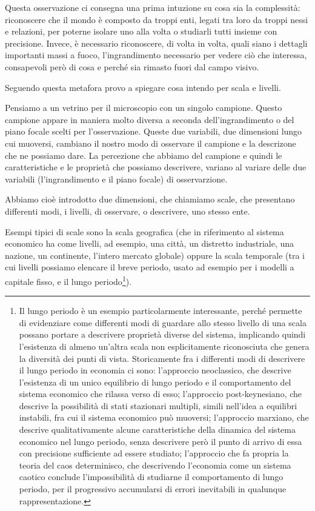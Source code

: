 \documentclass[a4paper, headings=standardclasses]{scrartcl}
\begin{document}
Questa osservazione ci consegna una prima intuzione su cosa sia la complessità: riconoscere che il mondo è composto da troppi enti, legati tra loro da troppi nessi e relazioni, per poterne isolare uno alla volta o studiarli tutti insieme con precisione. Invece, è necessario riconoscere, di volta in volta, quali siano i dettagli importanti massi a fuoco, l'ingrandimento necessario per vedere ciò che interessa, consapevoli però di cosa e perché sia rimasto fuori dal campo visivo.

Seguendo questa metafora provo a spiegare cosa intendo per scala e livelli.

Pensiamo a un vetrino per il microscopio con un singolo campione. Questo campione appare
in maniera molto diversa a seconda dell'ingrandimento o del piano focale scelti per l'osservazione.
Queste due variabili, due dimensioni lungo cui muoversi, cambiano il nostro modo di osservare il campione e la descrizone che ne possiamo dare.
La percezione che abbiamo del campione e quindi le caratteristiche e le proprietà che possiamo
descrivere, variano al variare delle due variabili (l'ingrandimento e il piano focale) di osservarzione.

Abbiamo cioè introdotto due dimensioni, che chiamiamo scale, che presentano differenti modi, i livelli, di osservare, o descrivere, uno stesso ente.

Esempi tipici di scale sono la scala geografica (che in riferimento al sistema economico ha come livelli, ad esempio, una città, un distretto industriale, una nazione, un continente, l'intero
mercato globale) oppure la scala temporale (tra i cui livelli possiamo elencare il breve periodo, usato ad esempio per i modelli a capitale fisso, e il lungo periodo\footnote{Il lungo periodo è un esempio particolarmente interessante, perché permette di evidenziare come differenti modi di guardare allo stesso livello di una scala possano portare a descrivere proprietà diverse del sistema, implicando quindi l'esistenza di almeno un'altra scala non esplicitamente riconosciuta che genera la diversità dei punti di vista.
Storicamente fra i differenti modi di descrivere il lungo periodo in economia ci sono: l'approccio neoclassico, che descrive l'esistenza di un unico equilibrio di lungo periodo e il comportamento del sistema economico che rilassa verso di esso; l'approccio post-keynesiano, che descrive la possibilità di stati stazionari multipli, simili nell'idea a equilibri instabili, fra cui il sistema economico può muoversi; l'approccio marxiano, che descrive qualitativamente alcune caratteristiche della dinamica del sistema economico nel lungo periodo, senza descrivere però il punto di arrivo di essa con precisione sufficiente ad essere studiato; l'approccio che fa propria la teoria del caos determinisco, che descrivendo l'economia come un sistema caotico conclude l'impossibilità di studiarne il comportamento di lungo periodo, per il progressivo accumularsi di errori inevitabili in qualunque rappresentazione.}).
\end{document}
